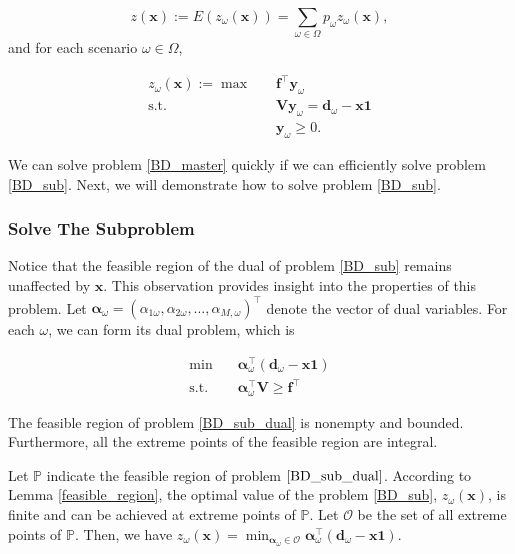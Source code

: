 $$z(\mathbf{x}) := E(z_{\omega}(\mathbf{x})) = \sum_{\omega \in \Omega} p_{\omega} z_{\omega}(\mathbf{x}),$$ and for each scenario $\omega \in \Omega$, 

\begin{equation}\label{BD_sub}
  \begin{aligned}
    z_{\omega}(\mathbf{x}) := \max \quad & \mathbf{f}^{\intercal} \mathbf{y}_{\omega} \\
    \text {s.t.} \quad & \mathbf{V} \mathbf{y}_{\omega} = \mathbf{d}_{\omega} - \mathbf{x} \mathbf{1} \\
     & \mathbf{y}_{\omega} \geq 0.
  \end{aligned}
\end{equation}

We can solve problem \eqref{BD_master} quickly if we can efficiently solve problem \eqref{BD_sub}. Next, we will demonstrate how to solve problem \eqref{BD_sub}.

\subsubsection{Solve The Subproblem}\label{second_stage}
Notice that the feasible region of the dual of problem \eqref{BD_sub} remains unaffected by $\mathbf{x}$. This observation provides insight into the properties of this problem. Let $\bm{\alpha}_{\omega} = (\alpha_{1\omega},\alpha_{2\omega}, \ldots, \alpha_{M,\omega})^{\intercal}$ denote the vector of dual variables. For each $\omega$, we can form its dual problem, which is 

\begin{equation}\label{BD_sub_dual}
  \begin{aligned}
    \min \quad & \bm{\alpha}_{\omega}^{\intercal} (\mathbf{d}_{\omega}- \mathbf{x} \mathbf{1}) \\
    \text {s.t.} \quad & \bm{\alpha}_{\omega}^{\intercal} \mathbf{V} \geq \mathbf{f}^{\intercal}
  \end{aligned}
\end{equation}

\begin{lem}\label{feasible_region}
 The feasible region of problem \eqref{BD_sub_dual} is nonempty and bounded. Furthermore, all the extreme points of the feasible region are integral.
\end{lem}

Let $\mathbb{P}$ indicate the feasible region of problem $\eqref{BD_sub_dual}$. According to Lemma \ref{feasible_region}, the optimal value of the problem \eqref{BD_sub}, $z_{\omega}(\mathbf{x})$, is finite and can be achieved at extreme points of $\mathbb{P}$. Let $\mathcal{O}$ be the set of all extreme points of $\mathbb{P}$. Then, we have $z_{\omega}(\mathbf{x}) = \min_{\bm{\alpha}_{\omega} \in \mathcal{O}} \bm{\alpha}_{\omega}^{\intercal}(\mathbf{d}_{\omega}- \mathbf{x} \mathbf{1})$.

